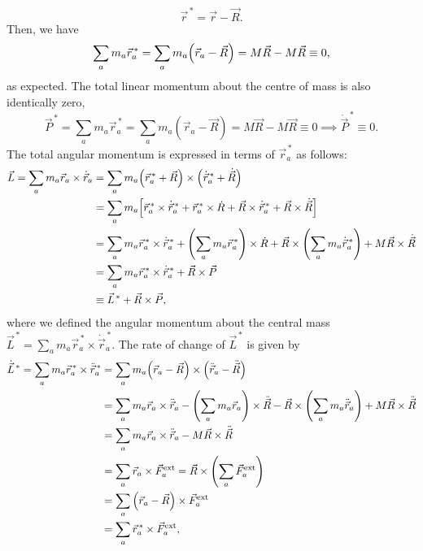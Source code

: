\documentclass{article}
\begin{document}
\begin{equation}
    \vec{r}^{\,*} = \vec{r} - \vec{R}.
\end{equation}
Then, we have
\begin{equation}
    \sum_a m_a \vec{r}^{\,*}_a = \sum_a m_a \qty(\vec{r}_a - \vec{R}) = M\vec{R} - M \vec{R} \equiv 0,
\end{equation}
as expected. The total linear momentum about the centre of mass is also identically zero,
\begin{equation}
    \vec{P}^{\,*} = \sum_a m_a \vec{r}^{\,*}_a = \sum_a m_a (\vec{r}_a - \vec{R}) = M\vec{R} - M\vec{R} \equiv 0 \implies \dot{\vec{P}}^{\,*} \equiv 0.
\end{equation}
The total angular momentum is expressed in terms of $\vec{r}^{\,*}_a$ as follows:
\begin{align}
    \begin{split}
        \vec{L} = \sum_a m_a \vec{r}_a \times \dot{\vec{r}}_a &= \sum_a m_a \qty(\vec{r}^{\,*}_a + \vec{R}) \times \qty(\dot{\vec{r}}^{\,*}_a + \dot{\vec{R}}) \\
        &= \sum_a m_a \qty[ \vec{r}^{\,*}_a \times \dot{\vec{r}}^{\,*}_a + \vec{r}^{\,*}_a \times \dot{R} + \vec{R} \times \dot{\vec{r}}^{\,*}_a + \vec{R} \times \dot{\vec{R}}] \\
        &= \sum_a m_a \vec{r}^{\,*}_a \times \dot{\vec{r}}^{\,*}_a + \qty(\sum_a m_a \vec{r}^{\,*}_a) \times \dot{R} + \vec{R} \times \qty(\sum_a m_a \dot{\vec{r}}^{\,*}_a) + M \vec{R} \times \dot{\vec{R}} \\
        &= \sum_a m_a \vec{r}^{\,*}_a \times \dot{\vec{r}}^{\,*}_a + \vec{R} \times \vec{P} \\
        &\equiv \vec{L}^{\,*} + \vec{R} \times \vec{P},
    \end{split}
\end{align}
where we defined the angular momentum about the central mass $\vec{L}^{\,*} = \sum_a m_a \vec{r}^{\,*}_a \times \dot{\vec{r}}^{\,*}_a$. The rate of change of $\vec{L}^{\,*}$ is given by
\begin{align}
    \begin{split}
        \dot{\vec{L}}^{\,*} = \sum_a m_a \vec{r}^{\,*}_a \times \ddot{\vec{r}}^{\,*}_a &= \sum_a m_a \qty(\vec{r}_a - \vec{R}) \times \qty(\ddot{\vec{r}}_a - \ddot{\vec{R}}) \\
        &= \sum_a m_a \vec{r}_a \times \ddot{\vec{r}}_a - \qty(\sum_a m_a \vec{r}_a) \times \ddot{\vec{R}} - \vec{R} \times \qty(\sum_a m_a \ddot{\vec{r}}_a) + M \vec{R} \times \ddot{\vec{R}} \\ 
        &= \sum_a m_a \vec{r}_a \times \ddot{\vec{r}}_a - M \vec{R} \times \ddot{\vec{R}} \\
        &= \sum_a \vec{r}_a \times \vec{F}_a^{\text{ext}} = \vec{R} \times \qty(\sum_a \vec{F}_a^{\text{ext}}) \\
        &= \sum_a \qty(\vec{r}_a - \vec{R}) \times \vec{F}_a^{\text{ext}} \\
        &= \sum_a \vec{r}^{\,*}_a \times  \vec{F}_a^{\text{ext}},
    \end{split}
\end{align}
\end{document}
